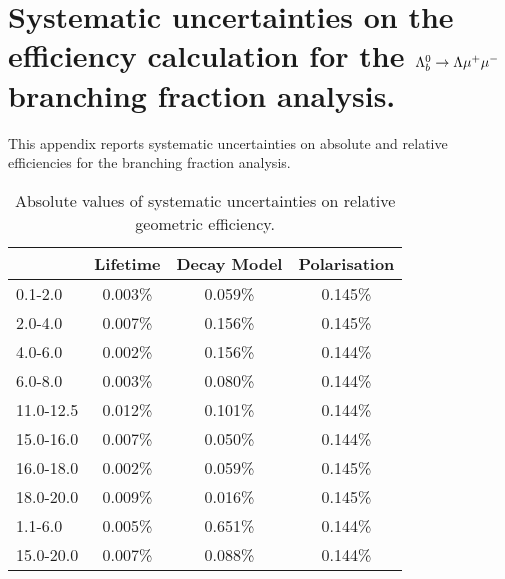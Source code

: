 \chapter{Systematic uncertainties on the efficiency calculation for the $\Lambda^0_b\rightarrow\Lambda\mu^+\mu^-$
branching fraction analysis.}
\label{app:Lb_systematics_app}

This appendix reports systematic uncertainties on absolute and relative 
efficiencies for the \Lb\to\Lz\mumu branching fraction analysis.


\begin{table}
\centering
\begin{tabular}{l|ccc} 
\qsq [\gevgevcccc]	 & Lifetime  & Decay Model   & Polarisation  \\ \hline
0.1-2.0  	 & 0.003\% 	 & 0.059\% 	 & 0.145\% 	 \\ 
2.0-4.0  	 & 0.007\% 	 & 0.156\% 	 & 0.145\% 	 \\ 
4.0-6.0  	 & 0.002\% 	 & 0.156\% 	 & 0.144\% 	 \\ 
6.0-8.0      & 0.003\%   & 0.080\%   & 0.144\%   \\
11.0-12.5  	 & 0.012\% 	 & 0.101\% 	 & 0.144\% 	 \\ 
15.0-16.0  	 & 0.007\% 	 & 0.050\% 	 & 0.144\% 	 \\ 
16.0-18.0  	 & 0.002\% 	 & 0.059\% 	 & 0.145\% 	 \\ 
18.0-20.0  	 & 0.009\% 	 & 0.016\% 	 & 0.145\% 	 \\ 
 \hline
1.1-6.0  	 & 0.005\% 	 & 0.651\% 	 & 0.144\% 	 \\ 
15.0-20.0  	 & 0.007\% 	 & 0.088\% 	 & 0.144\% 	 \\ 
\end{tabular}
\caption{Absolute values of systematic uncertainties on relative geometric efficiency.}
\label{tab:relativeGeomSys}
\end{table}

